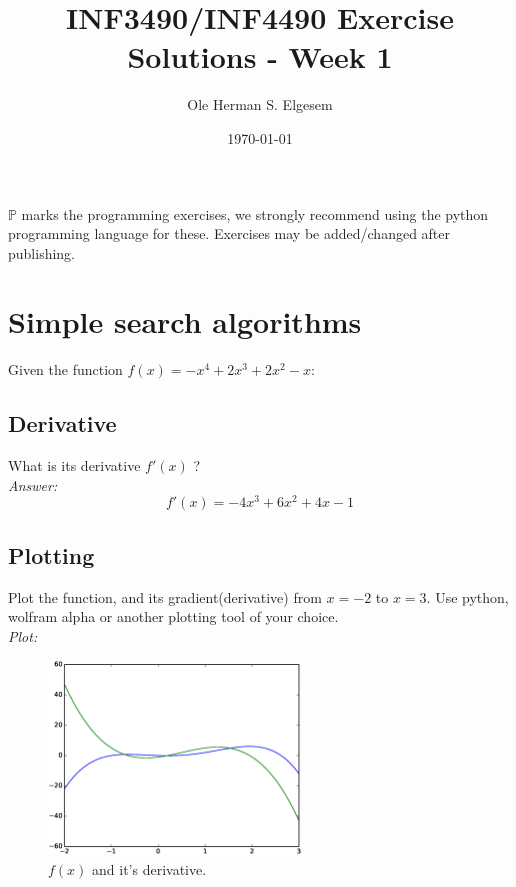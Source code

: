 \documentclass{article}           %
\title{\vspace{-2cm}INF3490/INF4490 Exercise Solutions - Week 1}
\author{Ole Herman S. Elgesem}
\date{\today}
\newcommand\marginsymbol[1][0pt]{%
  \tabto*{0cm}\makebox[\dimexpr-1cm-#1\relax][r]{$\mathbb{P}$}\tabto*{\TabPrevPos}}
\begin{document}
    \renewcommand\marginsymbol[1][0pt]{%
  \tabto*{0cm}\makebox[-1cm][c]{$\mathbb{P}$}\tabto*{\TabPrevPos}}

\maketitle
\(\mathbb{P}\) marks the programming exercises, we strongly recommend using
the python programming language for these. Exercises may be added/changed
after publishing.

\section{Simple search algorithms}

Given the function \(f(x) = -x^4 + 2x^3 + 2x^2 - x\):

\subsection{Derivative}
What is its derivative \(f'(x)\) ?\\

\emph{Answer:}
\[f'(x) = -4x^3 + 6x^2 + 4x - 1\]

\subsection{Plotting \marginsymbol}
Plot the function, and its gradient(derivative) from \(x=-2\) to \(x=3\). Use
python, wolfram alpha or another plotting tool of your choice.\\

\emph{Plot:}
\begin{figure}[H]
\begin{center}
\includegraphics[width=0.6\textwidth]{eps/w1e1b.eps}
\caption{\(f(x)\) and it's derivative.}
\label{fig:w1e1b}
\end{center}
\end{figure}
\end{document}
